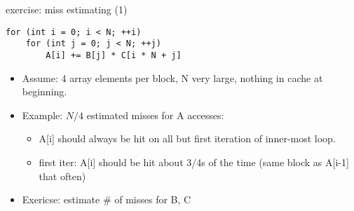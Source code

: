 \begin{frame}[fragile,label=missCountingEx]{exercise: miss estimating (1)}
\lstset{language=C,style=small}
\begin{lstlisting}
for (int i = 0; i < N; ++i)
    for (int j = 0; j < N; ++j)
        A[i] += B[j] * C[i * N + j]
\end{lstlisting}
\begin{itemize}
\item Assume: 4 array elements per block, N very large, nothing in cache at beginning.\\
\item Example: $N/4$ estimated misses for A accesses:
\begin{itemize}
\item A[i] should always be hit on all but first iteration of inner-most loop.
\item first iter: A[i] should be hit about 3/4s of the time (same block as A[i-1] that often)
\end{itemize}
\item Exericse: estimate \# of misses for B, C
\end{itemize}
\end{frame}

